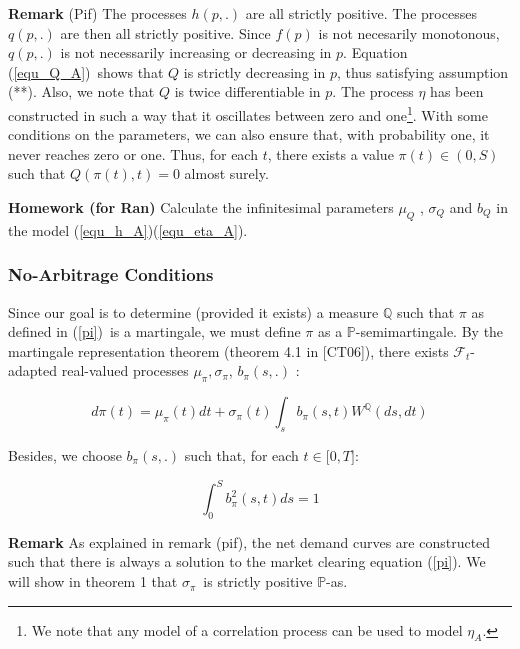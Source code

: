 \documentclass{article}
\begin{document}
\bigskip

\textbf{Remark} (Pif) The processes $h(p,.)$ are all strictly positive. The
processes $q(p,.)$ are then all strictly positive. Since $f(p)$ is not
necesarily monotonous, $q(p,.)$ is not necessarily increasing or decreasing
in $p$. Equation (\ref{equ_Q_A})\ shows that $Q$ is strictly decreasing in $%
p $, thus satisfying assumption (**). Also, we note that $Q$ is twice
differentiable in $p$. The process $\eta $ has been constructed in such a
way that it oscillates between zero and one\footnote{%
We note that any model of a correlation process can be used to model $\eta
_{A}$.}. With some conditions on the parameters, we can also ensure that,
with probability one, it never reaches zero or one. Thus, for each $t$,
there exists a value $\pi (t)\in (0,S)$ such that $Q(\pi (t),t)=0$ almost
surely.

\bigskip

\textbf{Homework (for Ran) }Calculate the infinitesimal parameters $\mu _{Q}$%
, $\sigma _{Q}$ and $b_{Q}$ in the model (\ref{equ_h_A})(\ref{equ_eta_A}).

\subsubsection{No-Arbitrage Conditions}

Since our goal is to determine (provided it exists) a measure $\mathbb{Q}$
such that $\pi $ as defined in (\ref{pi})\ is a martingale, we must define $%
\pi $ as a $\mathbb{P}$-semimartingale. By the martingale representation
theorem (theorem 4.1 in [CT06]), there exists $\mathcal{F}_{t}$-adapted
real-valued processes $\mu _{\pi },\sigma _{\pi }$, $b_{\pi }(s,.)$ :

\begin{equation*}
d\pi (t)=\mu _{\pi }(t)dt+\sigma _{\pi }(t)\int_{s}b_{\pi }(s,t)W^{\mathbb{Q}%
}(ds,dt)
\end{equation*}

Besides, we choose $b_{\pi }(s,.)$ such that, for each $t\in \lbrack 0,T]$:

\begin{equation*}
\int_{0}^{S}b_{\pi }^{2}(s,t)ds=1
\end{equation*}

\textbf{Remark} As explained in remark (pif), the net demand curves are
constructed such that there is always a solution to the market clearing
equation (\ref{pi}). We will show in theorem 1 that $\sigma _{\pi }$\ is
strictly positive $\mathbb{P}$-as.
\end{document}
